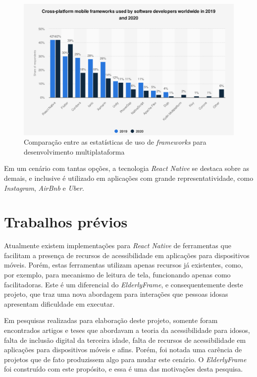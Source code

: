 \documentclass[
	12pt,				    %
	openright,			    %
	oneside,			    %
	a4paper,			    %
    sumario=tradicional,    %
	english,			    %
	brazil,				    %
	]{abntex2}              %
\begin{document}
\begin{figure}[H]
	\begin{center}
		\includegraphics[height=.5\linewidth]{images/mobile-frameworks-statista.png}
	\end{center}
	\caption[Comparativo de uso de frameworks para desenvolvimento multiplataforma]{Comparação entre as estatísticas de uso de \textit{frameworks} para desenvolvimento multiplataforma}
	\label{fig:statistaResearch}
\end{figure}

Em um cenário com tantas opções, a tecnologia \textit{React Native} se destaca sobre as demais, e inclusive é utilizado em aplicações com grande representatividade, como \textit{Instagram}, \textit{AirBnb} e \textit{Uber}.

\section{Trabalhos prévios}

Atualmente existem implementações para \textit{React Native} de ferramentas que facilitam a presença de recursos de acessibilidade em aplicações para dispositivos móveis. Porém, estas ferramentas utilizam apenas recursos já existentes, como, por exemplo, para mecanismo de leitura de tela, funcionando apenas como facilitadoras. Este é um diferencial do \textit{ElderlyFrame}, e consequentemente deste projeto, que traz uma nova abordagem para interações que pessoas idosas apresentam dificuldade em executar.

\par

Em pesquisas realizadas para elaboração deste projeto, somente foram encontrados artigos e teses que abordavam a teoria da acessibilidade para idosos, falta de inclusão digital da terceira idade, falta de recursos de acessibilidade em aplicações para dispositivos móveis e afins. Porém, foi notada uma carência de projetos que de fato produzissem algo para mudar este cenário. O \textit{ElderlyFrame} foi construído com este propósito, e essa é uma das motivações desta pesquisa.
\end{document}
